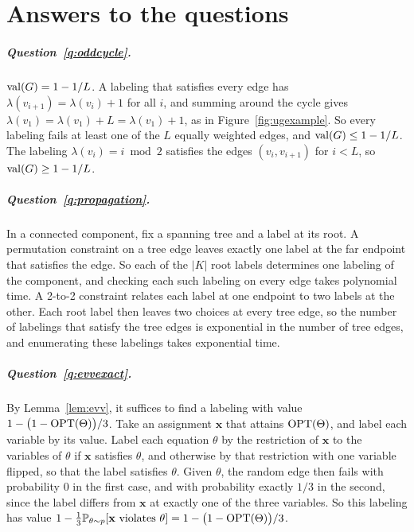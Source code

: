 \chapter{Answers to the questions}\label{app:answers}

\paragraph{Question~\ref{q:oddcycle}.} $\operatorname{val}(G)=1-1/L$. A labeling that satisfies every edge has $\lambda(v_{i+1})=\lambda(v_i)+1$ for all $i$, and summing around the cycle gives $\lambda(v_1)=\lambda(v_1)+L=\lambda(v_1)+1$, as in Figure~\ref{fig:ugexample}. So every labeling fails at least one of the $L$ equally weighted edges, and $\operatorname{val}(G)\le1-1/L$. The labeling $\lambda(v_i)=i\bmod2$ satisfies the edges $(v_i,v_{i+1})$ for $i<L$, so $\operatorname{val}(G)\ge1-1/L$.

\paragraph{Question~\ref{q:propagation}.} In a connected component, fix a spanning tree and a label at its root. A permutation constraint on a tree edge leaves exactly one label at the far endpoint that satisfies the edge. So each of the $|K|$ root labels determines one labeling of the component, and checking each such labeling on every edge takes polynomial time. A 2-to-2 constraint relates each label at one endpoint to two labels at the other. Each root label then leaves two choices at every tree edge, so the number of labelings that satisfy the tree edges is exponential in the number of tree edges, and enumerating these labelings takes exponential time.

\paragraph{Question~\ref{q:evvexact}.} By Lemma~\ref{lem:evv}, it suffices to find a labeling with value $1-\bigl(1-\operatorname{OPT}(\Theta)\bigr)/3$. Take an assignment $\mathbf x$ that attains $\operatorname{OPT}(\Theta)$, and label each variable by its value. Label each equation $\theta$ by the restriction of $\mathbf x$ to the variables of $\theta$ if $\mathbf x$ satisfies $\theta$, and otherwise by that restriction with one variable flipped, so that the label satisfies $\theta$. Given $\theta$, the random edge then fails with probability $0$ in the first case, and with probability exactly $1/3$ in the second, since the label differs from $\mathbf x$ at exactly one of the three variables. So this labeling has value $1-\tfrac13\mathbb{P}_{\theta\sim p}[\mathbf x\text{ violates }\theta]=1-\bigl(1-\operatorname{OPT}(\Theta)\bigr)/3$.

